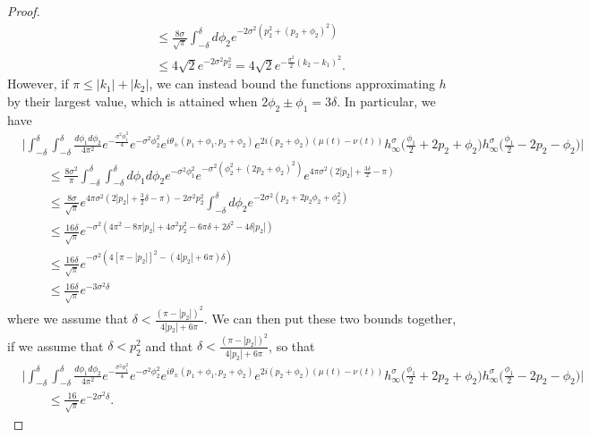 \documentclass[../thesis-main/thesis-main]{subfiles}
\begin{document}
\begin{proof}
\begin{align}
    & \qquad \leq \frac{8 \sigma}{\sqrt{\pi}} \int_{-\delta}^\delta d\phi_2 e^{ - 2\sigma^2 ( p_2^2 + (p_2 + \phi_2)^2)}\\
    &\qquad \leq 4\sqrt{2} e^{ -2 \sigma^2 p_2^2} = 4\sqrt{2} e^{-\frac{\sigma^2}{2} (k_2-k_1)^2}.
\end{align}
However, if $\pi \leq |k_1| + |k_2|$, we can instead bound the functions approximating $h$ by their largest value, which is attained when $2\phi_2 \pm \phi_1 = 3 \delta$.  In particular, we have
\begin{align}
    &\Bigg | \int_{-\delta}^\delta \int_{-\delta}^\delta \frac{d\phi_1 d\phi_2}{4\pi^2} e^{- \frac{\sigma^2 \phi_1^2}{4}}e^{-\sigma^2 \phi_2^2} e^{ i \theta_{\pm}(p_1+\phi_1, p_2+\phi_2)} e^{ 2 i( p_2 + \phi_2)(\mu(t) - \nu(t))}   h_\infty^{\sigma} \Big(\frac{\phi_1}{2} + 2p_2 +\phi_2 \Big) h_\infty^{\sigma} \Big(\frac{\phi_1}{2} - 2p_2 -\phi_2 \Big) \Bigg| \nonumber\\
    &  \qquad \leq \frac{8\sigma^2}{\pi}\int_{-\delta}^\delta \int_{-\delta}^\delta {d\phi_1 d\phi_2}  e^{- \sigma^2 \phi_1^2}e^{-\sigma^2 (\phi_2^2 + (2p_2 + \phi_2)^2)} e^{ 4 \pi \sigma^2 ( 2|p_2| + \frac{3\delta}{2} - \pi)} \\
    & \qquad \leq \frac{8 \sigma}{\sqrt{\pi}} e^{4\pi \sigma^2 (2|p_2| + \frac{3}{2}\delta -\pi) - 2 \sigma^2 p_2^2 } \int_{-\delta}^\delta d\phi_2 e^{ -2\sigma^2( p_2 + 2 p_2 \phi_2 + \phi_2^2)}\\
    &\qquad \leq \frac{16\delta}{\sqrt{\pi}}e^{-\sigma^2 ( 4\pi^2  - 8 \pi |p_2|  + 4 \sigma^2 p_2^2 - 6 \pi \delta + 2\delta^2 - 4 \delta |p_2| )}\\
    & \qquad \leq \frac{16 \delta}{\sqrt{\pi}} e^{ -\sigma^2 (4 [\pi - |p_2|]^2 - (4|p_2| + 6\pi)\delta)}\\
    &\qquad \leq \frac{ 16 \delta}{\sqrt{\pi}} e^{ - 3 \sigma^2 \delta}
\end{align}
where we assume that $\delta < \frac{ (\pi - |p_2|)^2}{4|p_2| + 6\pi}$.  We can then put these two bounds together, if we assume that $\delta < p_2^2$ and that $\delta <  \frac{ (\pi - |p_2|)^2}{4|p_2| + 6\pi}$, so that 
\begin{align}
    &\Bigg | \int_{-\delta}^\delta \int_{-\delta}^\delta \frac{d\phi_1 d\phi_2}{4\pi^2} e^{- \frac{\sigma^2 \phi_1^2}{4}}e^{-\sigma^2 \phi_2^2} e^{ i \theta_{\pm}(p_1+\phi_1, p_2+\phi_2)} e^{ 2 i( p_2 + \phi_2)(\mu(t) - \nu(t))}   h_\infty^{\sigma} \Big(\frac{\phi_1}{2} + 2p_2 +\phi_2 \Big) h_\infty^{\sigma} \Big(\frac{\phi_1}{2} - 2p_2 -\phi_2 \Big) \Bigg| \nonumber\\
    & \qquad \leq \frac{16 }{\sqrt{\pi}} e^{ - 2 \sigma^2 \delta}.
\end{align}


\end{proof}
\end{document}
